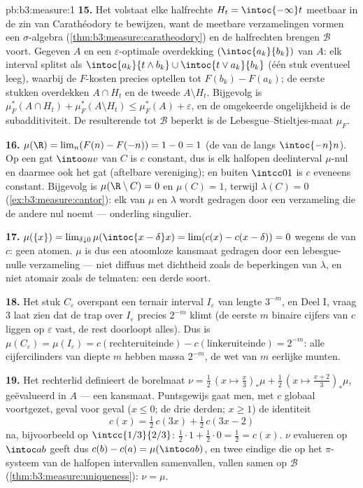 \begin{solution}{pb:b3:measure:1}
\textbf{15.} Het volstaat elke halfrechte $H_t = \intoc{-\infty}t$
meetbaar in de zin van Carathéodory te bewijzen, want de meetbare
verzamelingen vormen een $\sigma$-algebra
(\cref{thm:b3:measure:caratheodory}) en de halfrechten brengen
$\mathcal B$ voort. Gegeven $A$ en een $\varepsilon$-optimale
overdekking $(\intoc{a_k}{b_k})$ van $A$: elk interval splitst als
$\intoc{a_k}{t\wedge b_k} \cup \intoc{t \vee a_k}{b_k}$ (één stuk
eventueel leeg), waarbij de $F$-kosten precies optellen tot $F(b_k)
- F(a_k)$; de eerste stukken overdekken $A \cap H_t$ en de tweede
$A \setminus H_t$. Bijgevolg is $\mu_F^*(A\cap H_t) +
\mu_F^*(A\setminus H_t) \leq \mu_F^*(A) + \varepsilon$, en de
omgekeerde ongelijkheid is de subadditiviteit. De resulterende
 tot $\mathcal B$ beperkt is de Lebesgue--Stieltjes-maat
$\mu_F$.

\textbf{16.} $\mu(\R) = \lim_n(F(n) - F(-n)) = 1 - 0 = 1$ (de
 van de  langs $\intoc{-n}n$). Op een gat $\intoo
uv$ van $C$ is $c$ constant, dus is elk halfopen deelinterval
$\mu$-nul en daarmee ook het gat (aftelbare vereniging); en buiten
$\intcc01$ is $c$ eveneens constant. Bijgevolg is $\mu(\R\setminus
C) = 0$ en $\mu(C) = 1$, terwijl $\lambda(C) = 0$
(\cref{ex:b3:measure:cantor}): elk van $\mu$ en $\lambda$ wordt
gedragen door een verzameling die de andere nul noemt ---
onderling singulier.

\textbf{17.} $\mu(\{x\}) = \lim_{\delta\downarrow0}
\mu(\intoc{x-\delta}x) = \lim(c(x) - c(x-\delta)) = 0$ wegens de
 van $c$: geen atomen. $\mu$ is dus een atoomloze
kansmaat gedragen door een lebesgue-nulle  verzameling ---
niet diffuus met dichtheid zoals de beperkingen van $\lambda$, en
niet atomair zoals de telmaten: een derde soort.

\textbf{18.} Het stuk $C_\varepsilon$ overspant een ternair
interval $I_\varepsilon$ van lengte $3^{-m}$, en Deel I, vraag 3
laat zien dat de trap over $I_\varepsilon$ precies $2^{-m}$ klimt
(de eerste $m$ binaire cijfers van $c$ liggen op $\varepsilon$
vast, de rest doorloopt alles). Dus is $\mu(C_\varepsilon) =
\mu(I_\varepsilon) = c(\text{rechteruiteinde}) -
c(\text{linkeruiteinde}) = 2^{-m}$: alle cijfercilinders van
diepte $m$ hebben massa $2^{-m}$, de wet van $m$ eerlijke
munten.

\textbf{19.} Het rechterlid definieert de borelmaat $\nu =
\frac12\,(x \mapsto \tfrac x3)_*\mu + \frac12\,(x \mapsto
\tfrac{x+2}3)_*\mu$, geëvalueerd in $A$ --- een kansmaat.
Puntsgewijs gaat men, met $c$ globaal voortgezet, geval voor geval
($x \leq 0$; de drie derden; $x \geq 1$) de identiteit
\[
c(x) = \tfrac12\,c(3x) + \tfrac12\,c(3x - 2)
\]
na, bijvoorbeeld op $\intcc{1/3}{2/3}$: $\frac12\cdot1 +
\frac12\cdot0 = \frac12 = c(x)$. $\nu$ evalueren op $\intoc ab$
geeft dus $c(b) - c(a) = \mu(\intoc ab)$, en twee eindige 
die op het $\pi$-systeem van de halfopen intervallen samenvallen,
vallen samen op $\mathcal B$
(\cref{thm:b3:measure:uniqueness}): $\nu = \mu$.


\end{solution}
